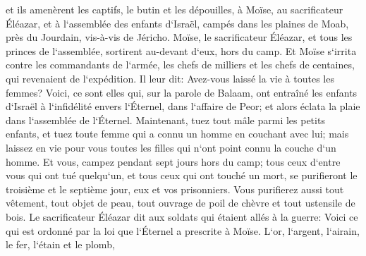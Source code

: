 \verse et ils amenèrent les captifs, le butin et les dépouilles, à Moïse, au sacrificateur Éléazar, et à l`assemblée des enfants d`Israël, campés dans les plaines de Moab, près du Jourdain, vis-à-vis de Jéricho. 
\verse Moïse, le sacrificateur Éléazar, et tous les princes de l`assemblée, sortirent au-devant d`eux, hors du camp. 
\verse Et Moïse s`irrita contre les commandants de l`armée, les chefs de milliers et les chefs de centaines, qui revenaient de l`expédition. 
\verse Il leur dit: Avez-vous laissé la vie à toutes les femmes? 
\verse Voici, ce sont elles qui, sur la parole de Balaam, ont entraîné les enfants d`Israël à l`infidélité envers l`Éternel, dans l`affaire de Peor; et alors éclata la plaie dans l`assemblée de l`Éternel. 
\verse Maintenant, tuez tout mâle parmi les petits enfants, et tuez toute femme qui a connu un homme en couchant avec lui; 
\verse mais laissez en vie pour vous toutes les filles qui n`ont point connu la couche d`un homme. 
\verse Et vous, campez pendant sept jours hors du camp; tous ceux d`entre vous qui ont tué quelqu`un, et tous ceux qui ont touché un mort, se purifieront le troisième et le septième jour, eux et vos prisonniers. 
\verse Vous purifierez aussi tout vêtement, tout objet de peau, tout ouvrage de poil de chèvre et tout ustensile de bois. 
\verse Le sacrificateur Éléazar dit aux soldats qui étaient allés à la guerre: Voici ce qui est ordonné par la loi que l`Éternel a prescrite à Moïse. 
\verse L`or, l`argent, l`airain, le fer, l`étain et le plomb, 
